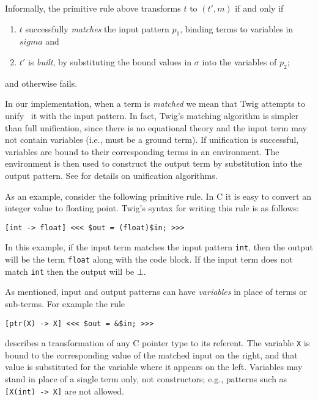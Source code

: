 Informally, the primitive rule above transforms $t$ to $(t',m)$ if
and only if

\begin{enumerate}

\item $t$ successfully \emph{matches} the input pattern $p_1$,
binding terms to variables in $sigma$ and

\item $t'$ is \emph{built}, by substituting the bound values in
$\sigma$ into the variables of $p_2$;

\end{enumerate}

and otherwise fails.

In our implementation, when a term is \emph{matched} we mean that
Twig attempts to unify~\cite{baader98rewriting} it with the input
pattern. In fact, Twig's matching algorithm is simpler than full
unification, since there is no equational theory and the input
term may not contain variables (i.e., must be a ground term). If
unification is successful, variables are bound to their
corresponding terms in an environment. The environment is then
used to construct the output term by substitution into the output
pattern. See \cite{baader98rewriting,system-s} for details on
unification algorithms.

As an example, consider the following primitive rule. In C it is
easy to convert an integer value to floating point. Twig's syntax
for writing this rule is as follows:

\begin{verbatim}
[int -> float] <<< $out = (float)$in; >>>
\end{verbatim}

In this example, if the input term matches the input pattern
\texttt{int}, then the output will be the term \texttt{float}
along with the code block. If the input term does not match
\texttt{int} then the output will be $\bot$.

As mentioned, input and output patterns can have \emph{variables}
in place of terms or sub-terms. For example the rule

\begin{verbatim}
[ptr(X) -> X] <<< $out = &$in; >>>
\end{verbatim}

describes a transformation of any C pointer type to its referent.
The variable \texttt{X} is bound to the corresponding value of the
matched input on the right, and that value is substituted for the
variable where it appears on the left. Variables may stand in
place of a single term only, not constructors; e.g., patterns such
as \texttt{[X(int)~->~X]} are not allowed.
